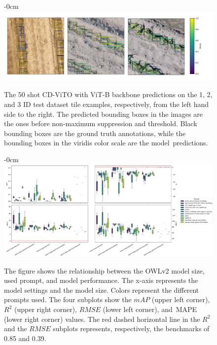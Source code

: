 \documentclass[12pt,a4paper,oneside]{report}
\newlength{\extralength}
\begin{document}
\begin{figure}[H]
  \begin{adjustwidth}{-\extralength}{0cm}
   \centering
  \includegraphics[width=19cm]{Plots/few_shot_annotations.pdf}
  \end{adjustwidth}
  \caption{The 50 shot CD-ViTO with ViT-B backbone predictions on the 
  1, 2, and 3 ID test dataset tile examples, respectively, from the left hand side to the right.
  The predicted bounding boxes in the images are the ones before 
  non-maximum suppression and threshold.
   Black bounding boxes are the ground truth annotations, while the bounding boxes 
   in the viridis color scale are the \mbox{model predictions.}}
  \label{fig:annotations_few-shot}

\end{figure}



\begin{figure}[H]
  \begin{adjustwidth}{-\extralength}{0cm}
  \centering
  \includegraphics[width=16cm]{Plots/zeroshot.pdf}
  \end{adjustwidth}
  \caption{The figure shows the relationship between the OWLv2 model size, used prompt,
  and model performance.
  The x-axis represents the model settings and the model size.
  Colors represent the different prompts used.
  The four subplots show the $mAP$ (upper left corner), $R^2$ (upper right corner),
  $RMSE$ (lower left corner), and~MAPE (lower right corner) values.
  The red dashed horizontal line in the $R^2$ and the $RMSE$ subplots represents, 
  respectively, the benchmarks of 0.85 and 0.39. 
  }
  \label{fig:zeroshots_vs_performance}

\end{figure}
\end{document}
